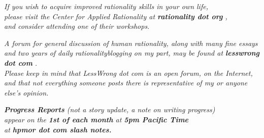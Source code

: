 \emph{If you wish to acquire improved rationality skills in your own
life,}\\ \emph{please visit the Center for Applied Rationality at
\textbf{rationality dot org} ,}\\ \emph{and consider attending one of
their workshops.}

\emph{A forum for general discussion of human rationality, along with
many fine essays}\\ \emph{and two years of daily rationalityblogging on
my part, may be found at \textbf{lesswrong dot com} .}\\ \emph{Please
keep in mind that LessWrong dot com is an open forum, on the
Internet,}\\ \emph{and that not everything someone posts there is
representative of my or anyone else's opinion.}

\emph{\textbf{Progress Reports} (not a story update, a note on writing
progress)\\ appear on the \textbf{1st of each month} at \textbf{5pm
Pacific Time\\} at \textbf{hpmor dot com slash notes.}}
